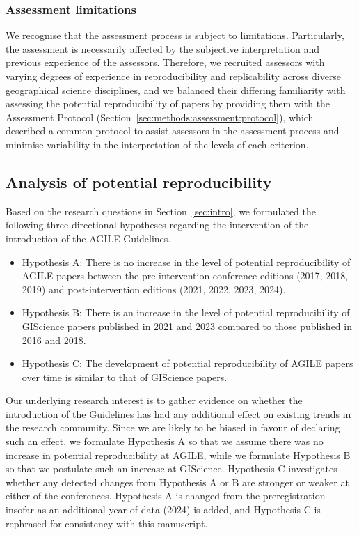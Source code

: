 \documentclass{josis}
\begin{document}
\subsubsection{Assessment limitations}

We recognise that the assessment process is subject to limitations. Particularly, the assessment is necessarily affected by the subjective interpretation and previous experience of the assessors.
Therefore, we recruited assessors with varying degrees of experience in reproducibility and replicability across diverse geographical science disciplines, and we balanced their differing familiarity with assessing the potential reproducibility of papers by providing them with the Assessment Protocol (Section~\ref{sec:methods:assessment:protocol}), which described a common protocol to assist assessors in the assessment process and minimise variability in the interpretation of the levels of each criterion.

\subsection{Analysis of potential reproducibility}

Based on the research questions in Section~\ref{sec:intro}, we formulated the following three directional hypotheses regarding the intervention of the introduction of the AGILE Guidelines.

\begin{itemize}
    \item Hypothesis A: There is no increase in the level of potential reproducibility of AGILE papers between the pre-intervention conference editions (2017, 2018, 2019) and post-intervention editions (2021, 2022, 2023, 2024).
    \item Hypothesis B: There is an increase in the level of potential reproducibility of GIScience papers published in 2021 and 2023 compared to those published in 2016 and 2018.
    \item Hypothesis C: The development of potential reproducibility of AGILE papers over time is similar to that of GIScience papers.
\end{itemize}

Our underlying research interest is to gather evidence on whether the introduction of the Guidelines has had any additional effect on existing trends in the research community. 
Since we are likely to be biased in favour of declaring such an effect, we formulate Hypothesis A so that we assume there was no increase in potential reproducibility at AGILE, while we formulate Hypothesis B so that we postulate such an increase at GIScience. 
Hypothesis C investigates whether any detected changes from Hypothesis A or B are stronger or weaker at either of the conferences. 
Hypothesis A is changed from the preregistration~\cite{nust2023_prereg} insofar as an additional year of data (2024) is added, and Hypothesis C is rephrased for consistency with this manuscript. 
\end{document}

